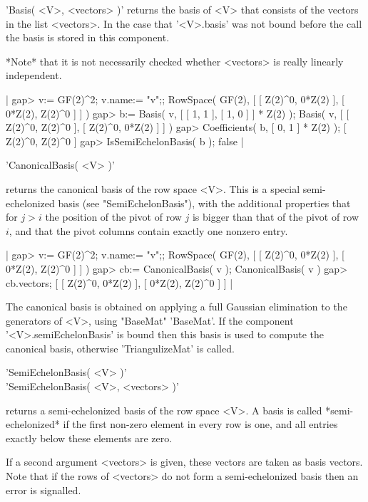 'Basis( <V>, <vectors> )' returns the basis of <V> that consists of the
vectors in the list <vectors>.  In the case that '<V>.basis' was not bound
before the call the basis is stored in this component.

*Note* that it is not necessarily checked whether <vectors> is really
linearly independent.

|    gap> v:= GF(2)^2; v.name:= "v";;
    RowSpace( GF(2), [ [ Z(2)^0, 0*Z(2) ], [ 0*Z(2), Z(2)^0 ] ] )
    gap> b:= Basis( v, [ [ 1, 1 ], [ 1, 0 ] ] * Z(2) );
    Basis( v, [ [ Z(2)^0, Z(2)^0 ], [ Z(2)^0, 0*Z(2) ] ] )
    gap> Coefficients( b, [ 0, 1 ] * Z(2) );
    [ Z(2)^0, Z(2)^0 ]
    gap> IsSemiEchelonBasis( b );
    false |


'CanonicalBasis( <V> )'

returns the canonical basis of the row space <V>.  This is a special
semi-echelonized basis (see "SemiEchelonBasis"), with the additional
properties that for $j > i$ the position of the pivot of row $j$ is bigger
than that of the pivot of row $i$, and that the pivot columns contain
exactly one nonzero entry.

|    gap> v:= GF(2)^2; v.name:= "v";;
    RowSpace( GF(2), [ [ Z(2)^0, 0*Z(2) ], [ 0*Z(2), Z(2)^0 ] ] )
    gap> cb:= CanonicalBasis( v );
    CanonicalBasis( v )
    gap> cb.vectors;
    [ [ Z(2)^0, 0*Z(2) ], [ 0*Z(2), Z(2)^0 ] ] |

The canonical basis is obtained on applying a full Gaussian elimination to
the generators of <V>, using "BaseMat" 'BaseMat'.
If the component '<V>.semiEchelonBasis' is bound then this basis is used to
compute the canonical basis, otherwise 'TriangulizeMat' is called.


'SemiEchelonBasis( <V> )' \\
'SemiEchelonBasis( <V>, <vectors> )'

returns a semi-echelonized basis of the row space <V>.
A basis is called *semi-echelonized* if the first non-zero element in every
row is one, and all entries exactly below these elements are zero.

If a second argument <vectors> is given, these vectors are taken as basis
vectors.  Note that if the rows of <vectors> do not form a semi-echelonized
basis then an error is signalled.

